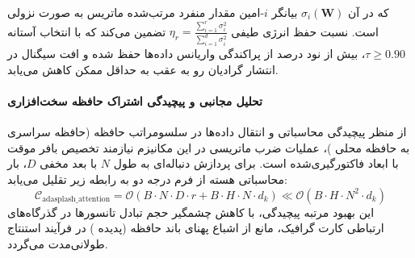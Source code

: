 که در آن $\sigma_i(\mathbf{W})$ بیانگر $i$-امین مقدار منفرد مرتب‌شده ماتریس به صورت نزولی است. نسبت حفظ انرژی طیفی $\eta_r = \frac{\sum_{i=1}^r \sigma_i^2}{\sum_{i=1}^{d} \sigma_i^2}$ تضمین می‌کند که با انتخاب آستانه $\tau \ge 0.90$، بیش از نود درصد از پراکندگی واریانس داده‌ها حفظ شده و افت سیگنال در انتشار گرادیان رو به عقب به حداقل ممکن کاهش می‌یابد.

\paragraph{تحلیل مجانبی و پیچیدگی اشتراک حافظه سخت‌افزاری}
از منظر پیچیدگی محاسباتی و انتقال داده‌ها در سلسومراتب حافظه (حافظه سراسری  به حافظه محلی )، عملیات ضرب ماتریسی در این مکانیزم نیازمند تخصیص بافر موقت با ابعاد فاکتورگیری‌شده است. برای پردازش دنباله‌ای به طول $N$ با بعد مخفی $D$، بار محاسباتی هسته از فرم درجه دو به رابطه زیر تقلیل می‌یابد:
\begin{equation}
\label{eq:complexity_adasplash_attention}
\mathcal{C}_{\text{adasplash\_attention}} = \mathcal{O}\left( B \cdot N \cdot D \cdot r + B \cdot H \cdot N \cdot d_k \right) \ll \mathcal{O}\left( B \cdot H \cdot N^2 \cdot d_k \right)
\end{equation}
این بهبود مرتبه پیچیدگی، با کاهش چشمگیر حجم تبادل تانسورها در گذرگاه‌های ارتباطی کارت گرافیک، مانع از اشباع پهنای باند حافظه (پدیده ) در فرآیند استنتاج طولانی‌مدت می‌گردد.